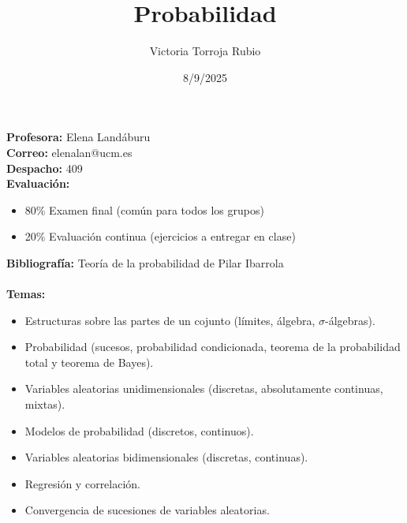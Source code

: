 \documentclass{report}
\begin{document}
\title{Probabilidad}
\author{Victoria Torroja Rubio}
\date{8/9/2025}

\maketitle

\tableofcontents

\pagebreak

\textbf{Profesora:} Elena Landáburu \\
\textbf{Correo:} elenalan@ucm.es \\
\textbf{Despacho:} 409 \\ 
\textbf{Evaluación:} 
\begin{itemize}
\item 80\% Examen final (común para todos los grupos)
\item 20\% Evaluación continua (ejercicios a entregar en clase)
\end{itemize}
\textbf{Bibliografía:} Teoría de la probabilidad de Pilar Ibarrola \\ \\
\textbf{Temas:} 
\begin{itemize}
\item Estructuras sobre las partes de un cojunto (límites, álgebra, $\displaystyle \sigma  $-álgebras).
\item Probabilidad (sucesos, probabilidad condicionada, teorema de la probabilidad total y teorema de Bayes).
\item Variables aleatorias unidimensionales (discretas, absolutamente continuas, mixtas).
\item Modelos de probabilidad (discretos, continuos).
\item Variables aleatorias bidimensionales (discretas, continuas).
\item Regresión y correlación.
\item Convergencia de sucesiones de variables aleatorias.
\end{itemize}





\end{document}
